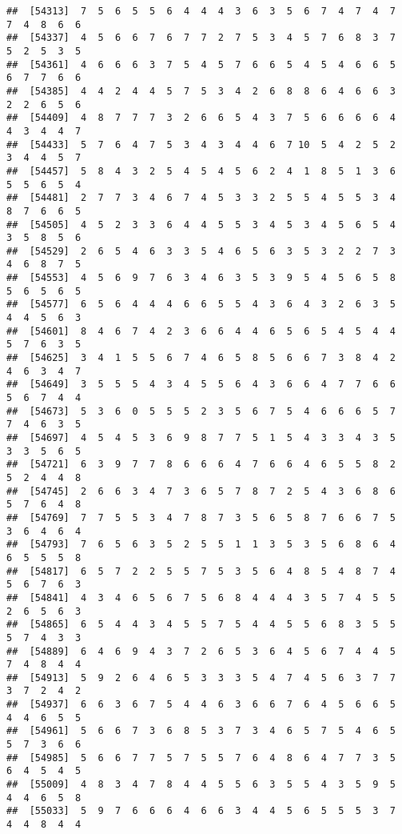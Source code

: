 \documentclass[
]{book}
\begin{document}
\begin{verbatim}
##  [54313]  7  5  6  5  5  6  4  4  4  3  6  3  5  6  7  4  7  4  7  7  4  8  6  6
##  [54337]  4  5  6  6  7  6  7  7  2  7  5  3  4  5  7  6  8  3  7  5  2  5  3  5
##  [54361]  4  6  6  6  3  7  5  4  5  7  6  6  5  4  5  4  6  6  5  6  7  7  6  6
##  [54385]  4  4  2  4  4  5  7  5  3  4  2  6  8  8  6  4  6  6  3  2  2  6  5  6
##  [54409]  4  8  7  7  7  3  2  6  6  5  4  3  7  5  6  6  6  6  4  4  3  4  4  7
##  [54433]  5  7  6  4  7  5  3  4  3  4  4  6  7 10  5  4  2  5  2  3  4  4  5  7
##  [54457]  5  8  4  3  2  5  4  5  4  5  6  2  4  1  8  5  1  3  6  5  5  6  5  4
##  [54481]  2  7  7  3  4  6  7  4  5  3  3  2  5  5  4  5  5  3  4  8  7  6  6  5
##  [54505]  4  5  2  3  3  6  4  4  5  5  3  4  5  3  4  5  6  5  4  3  5  8  5  6
##  [54529]  2  6  5  4  6  3  3  5  4  6  5  6  3  5  3  2  2  7  3  4  6  8  7  5
##  [54553]  4  5  6  9  7  6  3  4  6  3  5  3  9  5  4  5  6  5  8  5  6  5  6  5
##  [54577]  6  5  6  4  4  4  6  6  5  5  4  3  6  4  3  2  6  3  5  4  4  5  6  3
##  [54601]  8  4  6  7  4  2  3  6  6  4  4  6  5  6  5  4  5  4  4  5  7  6  3  5
##  [54625]  3  4  1  5  5  6  7  4  6  5  8  5  6  6  7  3  8  4  2  4  6  3  4  7
##  [54649]  3  5  5  5  4  3  4  5  5  6  4  3  6  6  4  7  7  6  6  5  6  7  4  4
##  [54673]  5  3  6  0  5  5  5  2  3  5  6  7  5  4  6  6  6  5  7  7  4  6  3  5
##  [54697]  4  5  4  5  3  6  9  8  7  7  5  1  5  4  3  3  4  3  5  3  3  5  6  5
##  [54721]  6  3  9  7  7  8  6  6  6  4  7  6  6  4  6  5  5  8  2  5  2  4  4  8
##  [54745]  2  6  6  3  4  7  3  6  5  7  8  7  2  5  4  3  6  8  6  5  7  6  4  8
##  [54769]  7  7  5  5  3  4  7  8  7  3  5  6  5  8  7  6  6  7  5  3  6  4  6  4
##  [54793]  7  6  5  6  3  5  2  5  5  1  1  3  5  3  5  6  8  6  4  6  5  5  5  8
##  [54817]  6  5  7  2  2  5  5  7  5  3  5  6  4  8  5  4  8  7  4  5  6  7  6  3
##  [54841]  4  3  4  6  5  6  7  5  6  8  4  4  4  3  5  7  4  5  5  2  6  5  6  3
##  [54865]  6  5  4  4  3  4  5  5  7  5  4  4  5  5  6  8  3  5  5  5  7  4  3  3
##  [54889]  6  4  6  9  4  3  7  2  6  5  3  6  4  5  6  7  4  4  5  7  4  8  4  4
##  [54913]  5  9  2  6  4  6  5  3  3  3  5  4  7  4  5  6  3  7  7  3  7  2  4  2
##  [54937]  6  6  3  6  7  5  4  4  6  3  6  6  7  6  4  5  6  6  5  4  4  6  5  5
##  [54961]  5  6  6  7  3  6  8  5  3  7  3  4  6  5  7  5  4  6  5  5  7  3  6  6
##  [54985]  5  6  6  7  7  5  7  5  5  7  6  4  8  6  4  7  7  3  5  6  4  5  4  5
##  [55009]  4  8  3  4  7  8  4  4  5  5  6  3  5  5  4  3  5  9  5  4  4  6  5  8
##  [55033]  5  9  7  6  6  6  4  6  6  3  4  4  5  6  5  5  5  3  7  4  4  8  4  4

\end{verbatim}
\end{document}
